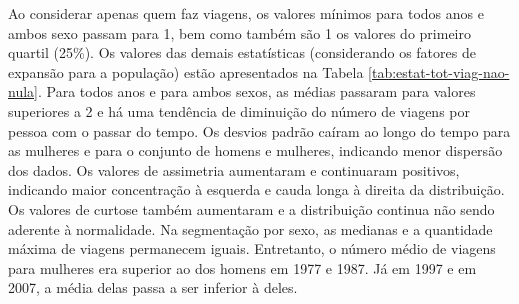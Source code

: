 Ao considerar apenas quem faz viagens, os valores mínimos para todos anos e ambos sexo passam para 1, bem como também são 1 os valores do primeiro quartil (25\%). Os valores das demais estatísticas (considerando os fatores de expansão para a população) estão apresentados na Tabela \ref{tab:estat-tot-viag-nao-nula}.
Para todos anos e para ambos sexos, as médias passaram para valores superiores a 2 e há uma tendência de diminuição do número de viagens por pessoa com o passar do tempo.
Os desvios padrão caíram ao longo do tempo para as mulheres e para o conjunto de homens e mulheres, indicando menor dispersão dos dados. Os valores de assimetria aumentaram e continuaram positivos, indicando maior concentração à esquerda e cauda longa à direita da distribuição. Os valores de curtose também aumentaram e a distribuição continua não sendo aderente à normalidade.
Na segmentação por sexo, as medianas e a quantidade máxima de viagens permanecem iguais.
Entretanto, o número médio de viagens para mulheres era superior ao dos homens em 1977 e 1987. Já em 1997 e em 2007, a média delas passa a ser inferior à deles.

